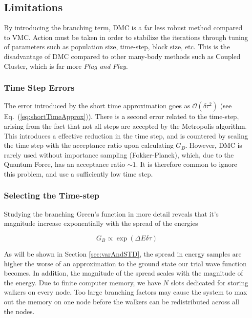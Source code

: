 \subsection{Limitations}

By introducing the branching term, DMC is a far less robust method compared to VMC. Action must be taken in order to stabilize the iterations through tuning of parameters such as population size, time-step, block size, etc. This is the disadvantage of DMC compared to other many-body methods such as Coupled Cluster, which is far more \textit{Plug and Play}.

\subsubsection{Time Step Errors}

The error introduced by the short time approximation goes as $\mathcal{O}(\delta\tau^2)$ (see Eq.~(\ref{eq:shortTimeApprox})). There is a second error related to the time-step, arising from the fact that not all steps are accepted by the Metropolis algorithm. This introduces a effective reduction in the time step, and is countered by scaling the time step with the acceptance ratio upon calculating $G_B$. However, DMC is rarely used without importance sampling (Fokker-Planck), which, due to the Quantum Force, has an acceptance ratio $\sim 1$. It is therefore common to ignore this problem, and use a sufficiently low time step.

\subsubsection{Selecting the Time-step}

Studying the branching Green's function in more detail reveals that it's magnitude increase exponentially with the spread of the energies

\begin{equation}
G_B \propto \exp{\left(\Delta E\delta\tau\right)} 
\end{equation}

As will be shown in Section \ref{sec:varAndSTD}, the spread in energy samples are higher the worse of an approximation to the ground state our trial wave function becomes. In addition, the magnitude of the spread scales with the magnitude of the energy. Due to finite computer memory, we have $N$ slots dedicated for storing walkers on every node. Too large branching factors may cause the system to max out the memory on one node before the walkers can be redistributed across all the nodes.

